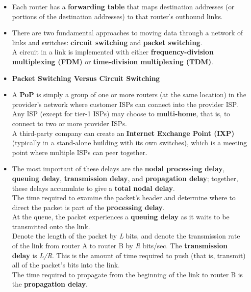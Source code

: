 \begin{itemize}
\item
Each router has a \textbf{forwarding table} that maps destination addresses (or portions of the destination addresses) to that router's outbound links.

\item
There are two fundamental approaches to moving data through a network of links and switches: \textbf{circuit switching} and \textbf{packet switching}.\\
A circuit in a link is implemented with either \textbf{frequency-division multiplexing (FDM)} or \textbf{time-division multiplexing (TDM)}.

\item
\textbf{Packet Switching Versus Circuit Switching}

\item
A \textbf{PoP} is simply a group of one or more routers (at the same location) in the provider's network where customer ISPs can connect into the provider ISP.\\
Any ISP (except for tier-1 ISPs) may choose to \textbf{multi-home}, that is, to connect to two or more provider ISPs.\\
A third-party company can create an \textbf{Internet Exchange Point (IXP)} (typically in a stand-alone building with its own switches), which is a meeting point where multiple ISPs can peer together.

\item
The most important of these delays are the \textbf{nodal processing delay}, \textbf{queuing delay}, \textbf{transmission delay}, and \textbf{propagation delay}; together, these delays accumulate to give a \textbf{total nodal delay}.\\
The time required to examine the packet's header and determine where to direct the packet is part of the \textbf{processing delay}.\\
At the queue, the packet experiences a \textbf{queuing delay} as it waits to be transmitted onto the link.\\
Denote the length of the packet by \textit{L} bits, and denote the transmission rate of the link from router A to router B by \textit{R} bits/sec. The \textbf{transmission delay} is \textit{L/R}. This is the amount of time required to push (that is, transmit) all of the packet's bits into the link.\\
The time required to propagate from the beginning of the link to router B is the \textbf{propagation delay}.


\end{itemize}
